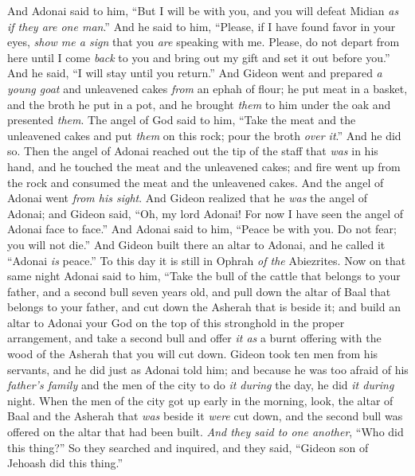 \begin{biblechapter}
\verse And Adonai said to him, “But I will be with you, and you will defeat Midian \textit{as if they are one man}.”
\verse And he said to him, “Please, if I have found favor in your eyes, \textit{show me a sign} that you \textit{are} speaking with me.
\verse Please, do not depart from here until I come \textit{back} to you and bring out my gift and set it out before you.” And he said, “I will stay until you return.”
\verse And Gideon went and prepared \textit{a young goat} and unleavened cakes \textit{from} an ephah of flour; he put meat in a basket, and the broth he put in a pot, and he brought \textit{them} to him under the oak and presented \textit{them}.
\verse The angel of God said to him, “Take the meat and the unleavened cakes and put \textit{them} on this rock; pour the broth \textit{over it}.” And he did so.
\verse Then the angel of Adonai reached out the tip of the staff that \textit{was} in his hand, and he touched the meat and the unleavened cakes; and fire went up from the rock and consumed the meat and the unleavened cakes. And the angel of Adonai went \textit{from his sight}.
\verse And Gideon realized that he \textit{was} the angel of Adonai; and Gideon said, “Oh, my lord Adonai! For now I have seen the angel of Adonai face to face.”
\verse And Adonai said to him, “Peace be with you. Do not fear; you will not die.”
\verse And Gideon built there an altar to Adonai, and he called it “Adonai \textit{is} peace.” To this day it is still in Ophrah \textit{of the} Abiezrites.
\verse Now on that same night Adonai said to him, “Take the bull of the cattle that belongs to your father, and a second bull seven years old, and pull down the altar of Baal that belongs to your father, and cut down the Asherah that is beside it;
\verse and build an altar to Adonai your God on the top of this stronghold in the proper arrangement, and take a second bull and offer \textit{it as} a burnt offering with the wood of the Asherah that you will cut down.
\verse Gideon took ten men from his servants, and he did just as Adonai told him; and because he was too afraid of his \textit{father’s family} and the men of the city to do \textit{it during} the day, he did \textit{it during} night.
 When the men of the city got up early in the morning, look, the altar of Baal and the Asherah that \textit{was} beside it \textit{were} cut down, and the second bull was offered on the altar that had been built.
\verse \textit{And they said to one another}, “Who did this thing?” So they searched and inquired, and they said, “Gideon son of Jehoash did this thing.”

\end{biblechapter}
